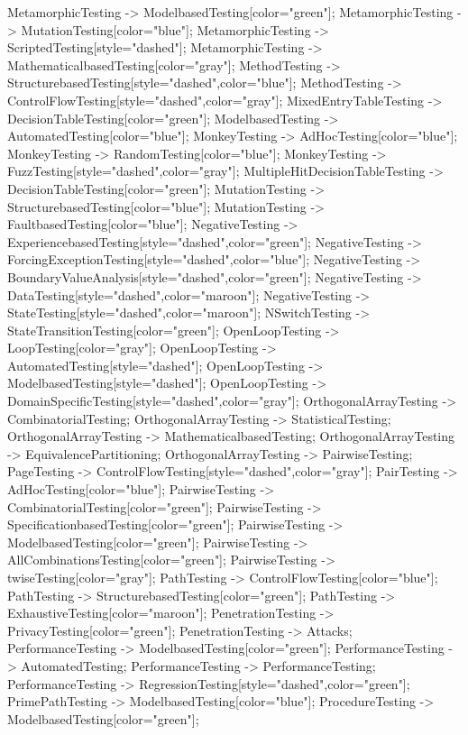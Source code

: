 \documentclass{article}
\begin{document}
{MetamorphicTesting -> ModelbasedTesting[color="green"];
MetamorphicTesting -> MutationTesting[color="blue"];
MetamorphicTesting -> ScriptedTesting[style="dashed"];
MetamorphicTesting -> MathematicalbasedTesting[color="gray"];
MethodTesting -> StructurebasedTesting[style="dashed",color="blue"];
MethodTesting -> ControlFlowTesting[style="dashed",color="gray"];
MixedEntryTableTesting -> DecisionTableTesting[color="green"];
ModelbasedTesting -> AutomatedTesting[color="blue"];
MonkeyTesting -> AdHocTesting[color="blue"];
MonkeyTesting -> RandomTesting[color="blue"];
MonkeyTesting -> FuzzTesting[style="dashed",color="gray"];
MultipleHitDecisionTableTesting -> DecisionTableTesting[color="green"];
MutationTesting -> StructurebasedTesting[color="blue"];
MutationTesting -> FaultbasedTesting[color="blue"];
NegativeTesting -> ExperiencebasedTesting[style="dashed",color="green"];
NegativeTesting -> ForcingExceptionTesting[style="dashed",color="blue"];
NegativeTesting -> BoundaryValueAnalysis[style="dashed",color="green"];
NegativeTesting -> DataTesting[style="dashed",color="maroon"];
NegativeTesting -> StateTesting[style="dashed",color="maroon"];
NSwitchTesting -> StateTransitionTesting[color="green"];
OpenLoopTesting -> LoopTesting[color="gray"];
OpenLoopTesting -> AutomatedTesting[style="dashed"];
OpenLoopTesting -> ModelbasedTesting[style="dashed"];
OpenLoopTesting -> DomainSpecificTesting[style="dashed",color="gray"];
OrthogonalArrayTesting -> CombinatorialTesting;
OrthogonalArrayTesting -> StatisticalTesting;
OrthogonalArrayTesting -> MathematicalbasedTesting;
OrthogonalArrayTesting -> EquivalencePartitioning;
OrthogonalArrayTesting -> PairwiseTesting;
PageTesting -> ControlFlowTesting[style="dashed",color="gray"];
PairTesting -> AdHocTesting[color="blue"];
PairwiseTesting -> CombinatorialTesting[color="green"];
PairwiseTesting -> SpecificationbasedTesting[color="green"];
PairwiseTesting -> ModelbasedTesting[color="green"];
PairwiseTesting -> AllCombinationsTesting[color="green"];
PairwiseTesting -> twiseTesting[color="gray"];
PathTesting -> ControlFlowTesting[color="blue"];
PathTesting -> StructurebasedTesting[color="green"];
PathTesting -> ExhaustiveTesting[color="maroon"];
PenetrationTesting -> PrivacyTesting[color="green"];
PenetrationTesting -> Attacks;
PerformanceTesting -> ModelbasedTesting[color="green"];
PerformanceTesting -> AutomatedTesting;
PerformanceTesting -> PerformanceTesting;
PerformanceTesting -> RegressionTesting[style="dashed",color="green"];
PrimePathTesting -> ModelbasedTesting[color="blue"];
ProcedureTesting -> ModelbasedTesting[color="green"];
}
\end{document}
